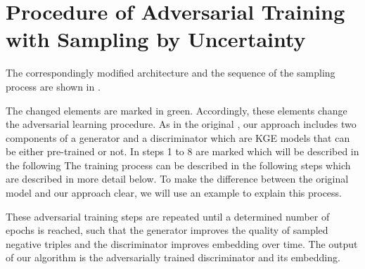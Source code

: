 \section{Procedure of Adversarial Training with Sampling by Uncertainty}
\label{sec:procedure}
%
The correspondingly modified architecture and the sequence of the sampling process are shown in .

The changed elements are marked in green.
Accordingly, these elements change the adversarial learning procedure.
As in the original \kbgan, our approach includes two components of a generator and a discriminator which are \ac{KGE} models that can be either pre-trained or not.
In  steps 1 to 8 are marked which will be described in the following 
The training process can be described in the following steps
which are described in more detail below.
To make the difference between the original model and our approach clear, we will use an example to explain this process.










These adversarial training steps are repeated until a determined number of epochs is reached, such that the generator improves the quality of sampled negative triples and the discriminator improves embedding over time.
The output of our algorithm is the adversarially trained discriminator and its embedding.



